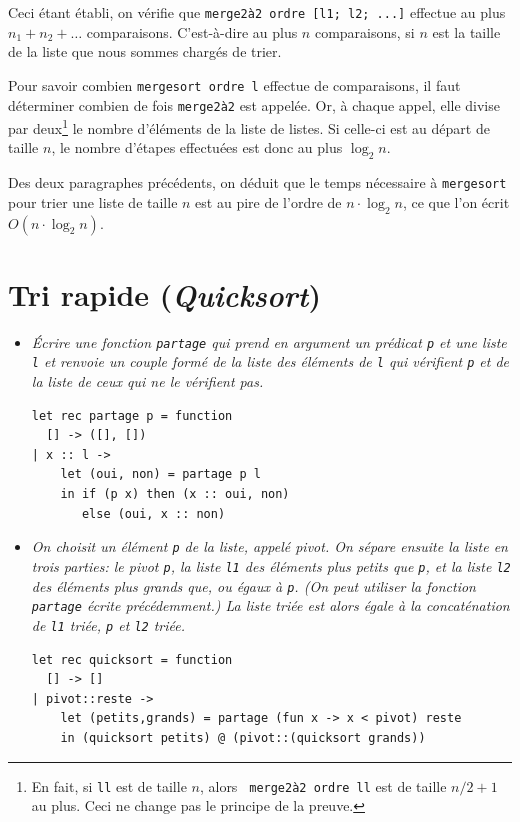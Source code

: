 \documentclass[11pt, a4paper]{article}
\begin{document}
\begin{itemize}
      Ceci étant établi, on vérifie que
      \texttt{merge2à2 ordre [l1; l2; ...]} effectue au plus $n_1 +
      n_2 + \ldots$ comparaisons. C'est-à-dire au plus $n$
      comparaisons, si $n$ est la taille de la liste que nous sommes
      chargés de trier.

      Pour savoir combien \texttt{mergesort ordre l} effectue de
      comparaisons, il faut déterminer combien de fois \verb+merge2à2+
      est appelée. Or, à chaque appel, elle divise par
      deux\footnote{En fait, si {\tt ll} est de taille $n$, alors {\tt
      merge2à2 ordre ll} est de taille $n/2+1$ au plus. Ceci ne change
      pas le principe de la preuve.}  le nombre d'éléments de la liste
      de listes. Si celle-ci est au départ de taille $n$, le nombre
      d'étapes effectuées est donc au plus $\log_2 n$.

      Des deux paragraphes précédents, on déduit que le temps
      nécessaire à \texttt{merge\-sort} pour trier une liste de taille
      $n$ est au pire de l'ordre de $n \cdot\log_2 n$, ce que l'on
      écrit $O(n \cdot\log_2 n)$.

\end{itemize}


\section{Tri rapide (\emph{Quicksort})}

\begin{itemize}

  \item[\textbf{C.1}] \emph{Écrire une fonction {\tt partage} qui
     prend en argument un prédicat {\tt p} et une liste {\tt l} et
     renvoie un couple formé de la liste des éléments de {\tt l} qui
     vérifient {\tt p} et de la liste de ceux qui ne le vérifient
     pas.}

{\small
\begin{verbatim}
let rec partage p = function
  [] -> ([], [])
| x :: l ->
    let (oui, non) = partage p l
    in if (p x) then (x :: oui, non)
       else (oui, x :: non)
\end{verbatim}
}

  \item[\textbf{C.2}] \emph{On choisit un élément {\tt p} de la liste,
     appelé \emph{pivot}. On sépare ensuite la liste en trois parties:
     le pivot {\tt p}, la liste {\tt l1} des éléments plus petits que
     {\tt p}, et la liste {\tt l2} des éléments plus grands que, ou
     égaux à {\tt p}. (On peut utiliser la fonction {\tt partage}
     écrite précédemment.)  La liste triée est alors égale à la
     concaténation de \texttt{l1} triée, {\tt p} et \texttt{l2}
     triée.}



{\small
 \begin{verbatim}
let rec quicksort = function
  [] -> []
| pivot::reste ->
    let (petits,grands) = partage (fun x -> x < pivot) reste
    in (quicksort petits) @ (pivot::(quicksort grands))
 \end{verbatim}
}


\end{itemize}
\end{document}
